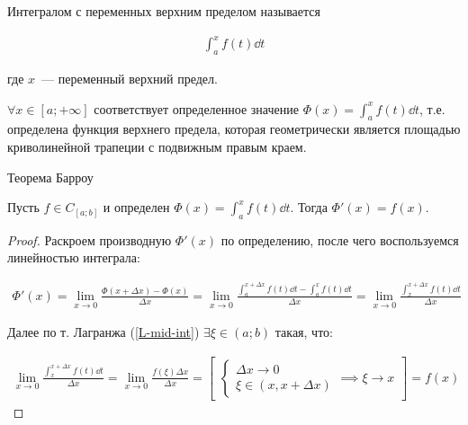 
\begin{multicols}{2}

\begin{definition}
  Интегралом с переменных верхним пределом называется
  
  \begin{align*}
    \int_{a}^{x} f(t) \dd t
  \end{align*}

  где \(x\)~--- переменный верхний предел.
\end{definition}
\end{multicols}

\begin{remark}
  \(\forall x \in [a; +\infty]\) соответствует определенное значение
  \(\Phi(x) = \int_{a}^{x} f(t) \dd t\), т.е. определена функция верхнего
  предела, которая геометрически является площадью криволинейной трапеции
  с подвижным правым краем.
\end{remark}

\begin{theorem}
  Теорема Барроу

  Пусть \(f \in C_{[a; b]}\) и определен \(\Phi(x) = \int_{a}^{x} f(t) \dd t\).
  Тогда \(\Phi'(x) = f(x)\).
\end{theorem}
\begin{proof}
  Раскроем производную \(\Phi'(x)\) по определению, после чего воспользуемся
  линейностью интеграла:

  \begin{align*}
    \Phi'(x)
    = \lim_{x \to 0} \frac{\Phi(x + \Delta x) - \Phi(x)}{\Delta x}
    = \lim_{x \to 0} \frac{
      \int_{a}^{x + \Delta x} f(t) \dd t - \int_{a}^{x} f(t) \dd t
    }{\Delta x}
    = \lim_{x \to 0} \frac{\int_{x}^{x + \Delta x} f(t) \dd t}{\Delta x}
  \end{align*}

  Далее по т. Лагранжа (\ref{L-mid-int}) \(\exists \xi \in (a; b)\) такая, что:

  \begin{align*}
    \lim_{x \to 0} \frac{\int_{x}^{x + \Delta x} f(t) \dd t}{\Delta x}
    = \lim_{x \to 0} \frac{f(\xi) \Delta x}{\Delta x}
    = \begin{bmatrix}
      \begin{cases}
        \Delta x \to 0 \\
        \xi \in (x, x + \Delta x)
      \end{cases}
      \implies \xi \to x
    \end{bmatrix}
    = f(x)
  \end{align*}
\end{proof}